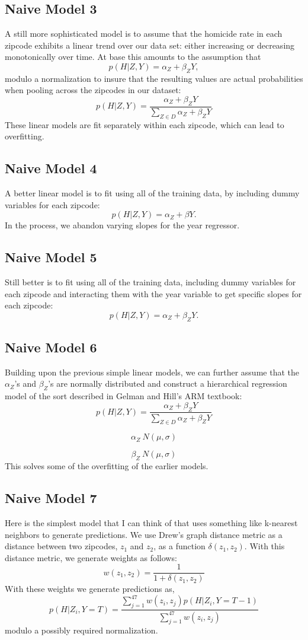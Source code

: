 \documentclass[11pt]{amsart}
\begin{document}
\subsection{Naive Model 3}
A still more sophisticated model is to assume that the homicide rate in each zipcode exhibits a linear trend over our data set: either increasing or decreasing monotonically over time. At base this amounts to the assumption that
\[
p(H | Z, Y) = \alpha_{Z} + \beta_{Z} Y,
\]
modulo a normalization to insure that the resulting values are actual probabilities when pooling across the zipcodes in our dataset:
\[
p(H | Z, Y) = \frac{\alpha_{Z} + \beta_{Z} Y}{\sum_{Z \in D} \alpha_{Z} + \beta_{Z} Y}
\]
These linear models are fit separately within each zipcode, which can lead to overfitting.

\subsection{Naive Model 4}
A better linear model is to fit using all of the training data, by including dummy variables for each zipcode:
\[
p(H | Z, Y) = \alpha_{Z} + \beta Y.
\]
In the process, we abandon varying slopes for the year regressor.

\subsection{Naive Model 5}
Still better is to fit using all of the training data, including dummy variables for each zipcode and interacting them with the year variable to get specific slopes for each zipcode:
\[
p(H | Z, Y) = \alpha_{Z} + \beta_{Z} Y.
\]

\subsection{Naive Model 6}
Building upon the previous simple linear models, we can further assume that the $\alpha_Z$'s and $\beta_Z$'s are normally distributed and construct a hierarchical regression model of the sort described in Gelman and Hill's ARM textbook:
\[
p(H | Z, Y) = \frac{\alpha_{Z} + \beta_{Z} Y}{\sum_{Z \in D} \alpha_{Z} + \beta_{Z} Y}
\]

\[
\alpha_{Z} ~ N(\mu, \sigma)
\]

\[
\beta_{Z} ~ N(\mu, \sigma)
\]
This solves some of the overfitting of the earlier models.

\subsection{Naive Model 7}
Here is the simplest model that I can think of that uses something like k-nearest neighbors to generate predictions. We use Drew's graph distance metric as a distance between two zipcodes, $z_{1}$ and $z_{2}$, as a function $\delta(z_{1}, z_{2})$. With this distance metric, we generate weights as follows:
\[
w(z_{1}, z_{2}) = \frac{1}{1 + \delta(z_{1}, z_{2})}
\]
With these weights we generate predictions as,
\[
p(H | Z_{i}, Y = T) = \frac{\sum_{j = 1}^{47} w(z_{i}, z_{j}) p(H | Z_{i}, Y = T - 1)}{\sum_{j = 1}^{47} w(z_{i}, z_{j})}
\]
modulo a possibly required normalization.
\end{document}
